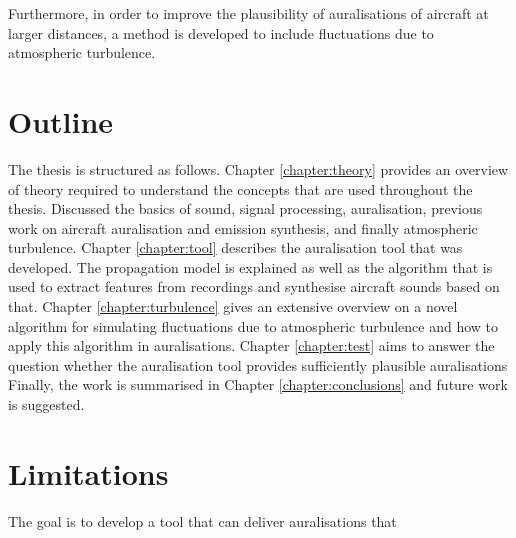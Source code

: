 Furthermore, in order to improve the plausibility of auralisations of aircraft
at larger distances, a method is developed to include fluctuations due to
atmospheric turbulence.


%
%
%

\section{Outline}
The thesis is structured as follows.
\newline
\newline
Chapter \ref{chapter:theory} provides an overview of theory required to understand the concepts that are used throughout the thesis.
Discussed the basics of sound, signal processing, auralisation, previous work on aircraft auralisation and emission synthesis, and finally atmospheric turbulence.
\newline
\newline
Chapter \ref{chapter:tool} describes the auralisation tool that was developed. The propagation model is explained as well as the algorithm that is used to extract features from recordings and synthesise aircraft sounds based on that.
\newline
\newline
Chapter \ref{chapter:turbulence} gives an extensive overview on a novel algorithm for simulating fluctuations due to atmospheric turbulence and how to apply this algorithm in auralisations.
\newline
\newline
Chapter \ref{chapter:test} aims to answer the question whether the auralisation tool provides sufficiently plausible auralisations
\newline
\newline
Finally, the work is summarised in Chapter \ref{chapter:conclusions} and future work is suggested.


\section{Limitations}
The goal is to develop a tool that can deliver auralisations that 


